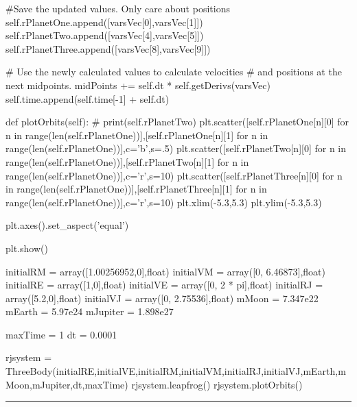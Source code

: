 \begin{enumerate}
\begin{codeexample}
\begin{VerbatimOut}{\listingFile}
            #Save the updated values. Only care about positions
            self.rPlanetOne.append([varsVec[0],varsVec[1]])
            self.rPlanetTwo.append([varsVec[4],varsVec[5]])
            self.rPlanetThree.append([varsVec[8],varsVec[9]])

            # Use the newly calculated values to calculate velocities
            # and positions at the next midpoints. 
            midPoints += self.dt * self.getDerivs(varsVec)
            self.time.append(self.time[-1] + self.dt)


    def plotOrbits(self):
        #        print(self.rPlanetTwo)
        plt.scatter([self.rPlanetOne[n][0] for n in range(len(self.rPlanetOne))],[self.rPlanetOne[n][1] for n in range(len(self.rPlanetOne))],c='b',s=.5)
        plt.scatter([self.rPlanetTwo[n][0] for n in range(len(self.rPlanetOne))],[self.rPlanetTwo[n][1] for n in range(len(self.rPlanetOne))],c='r',s=10)
        plt.scatter([self.rPlanetThree[n][0] for n in range(len(self.rPlanetOne))],[self.rPlanetThree[n][1] for n in range(len(self.rPlanetOne))],c='r',s=10)
        plt.xlim(-5.3,5.3)
        plt.ylim(-5.3,5.3)

        plt.axes().set_aspect('equal')
 
        plt.show()



initialRM = array([1.00256952,0],float)
initialVM = array([0, 6.46873],float)
initialRE = array([1,0],float)
initialVE = array([0, 2 * pi],float)
initialRJ = array([5.2,0],float)
initialVJ = array([0, 2.75536],float)
mMoon = 7.347e22
mEarth = 5.97e24
mJupiter = 1.898e27

maxTime =  1
dt = 0.0001

rjsystem = ThreeBody(initialRE,initialVE,initialRM,initialVM,initialRJ,initialVJ,mEarth,mMoon,mJupiter,dt,maxTime)
rjsystem.leapfrog()
rjsystem.plotOrbits()
\end{VerbatimOut}
\end{codeexample}
\else
\noindent\rule{5 in}{0.01 in}
\fi

\end{enumerate}